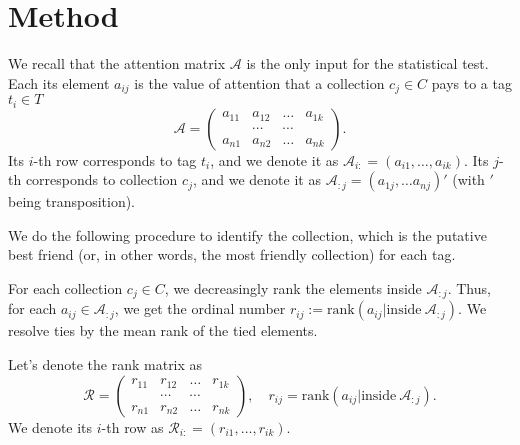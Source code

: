 \documentclass{llncs}
\begin{document}
\section{Method}
\label{sec:method}


We recall that the attention matrix $\mathcal{A}$ is the only input for the statistical test. Each its element $a_{ij}$ is the value of attention that a collection $c_j \in C$ pays to a tag $t_i \in T$
\[
\mathcal{A} = \begin{pmatrix}
a_{11} & a_{12} & \dots & a_{1k} \\
       &\cdots & \cdots &  \\
a_{n1} & a_{n2} & \dots & a_{nk}
\end{pmatrix}.
\]
Its $i$-th row corresponds to tag $t_i$, and we denote it as $\mathcal{A}_{i:} = (a_{i1}, \dots, a_{ik})$. Its $j$-th  corresponds to collection $c_j$, and we denote it as $\mathcal{A}_{:j} =(a_{1j}, \dots a_{nj})'$ (with $'$ being transposition).


We do the following procedure to identify the collection, which is the putative best friend (or, in other words, the most friendly collection) for each tag.

For each collection $c_j \in C$, we decreasingly rank the elements inside $\mathcal{A}_{:j}$. Thus, for each $a_{ij} \in \mathcal{A}_{:j}$, we get the ordinal number $r_{ij}:=\text{rank}\left(a_{ij}|\text{inside}~\mathcal{A}_{:j}\right)$. We resolve ties by the mean rank of the tied elements. 

Let's denote the rank matrix as 
\begin{equation}
\label{def:R}
\mathcal{R} = \begin{pmatrix}
r_{11} & r_{12} & \dots & r_{1k} \\
       &\cdots & \cdots &  \\
r_{n1} & r_{n2} & \dots & r_{nk}
\end{pmatrix}, 
\quad
r_{ij} =\text{rank}\left(a_{ij}|\text{inside}~\mathcal{A}_{:j}\right).
\end{equation}
We denote its $i$-th row as $\mathcal{R}_{i:} = (r_{i1}, \dots, r_{ik})$.
\end{document}
